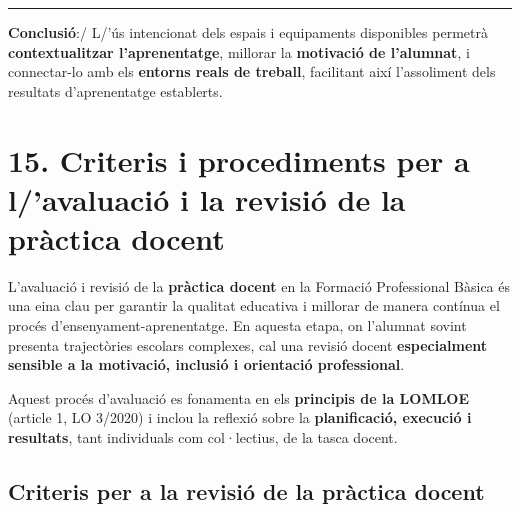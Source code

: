 \documentclass[
  paper=a4,
  ,captions=tableheading
]{scrartcl}
\begin{document}
\begin{center}\rule{0.5\linewidth}{0.5pt}\end{center}

\textbf{Conclusió}:/ L/'ús intencionat dels espais i equipaments
disponibles permetrà \textbf{contextualitzar l'aprenentatge}, millorar
la \textbf{motivació de l'alumnat}, i connectar-lo amb els
\textbf{entorns reals de treball}, facilitant així l'assoliment dels
resultats d'aprenentatge establerts.

\hypertarget{criteris-i-procediments-per-a-lavaluaciuxf3-i-la-revisiuxf3-de-la-pruxe0ctica-docent}{%
\section{15. Criteris i procediments per a l/'avaluació i la revisió de
la pràctica
docent}\label{criteris-i-procediments-per-a-lavaluaciuxf3-i-la-revisiuxf3-de-la-pruxe0ctica-docent}}

L'avaluació i revisió de la \textbf{pràctica docent} en la Formació
Professional Bàsica és una eina clau per garantir la qualitat educativa
i millorar de manera contínua el procés d'ensenyament-aprenentatge. En
aquesta etapa, on l'alumnat sovint presenta trajectòries escolars
complexes, cal una revisió docent \textbf{especialment sensible a la
motivació, inclusió i orientació professional}.

Aquest procés d'avaluació es fonamenta en els \textbf{principis de la
LOMLOE} (article 1, LO 3/2020) i inclou la reflexió sobre la
\textbf{planificació, execució i resultats}, tant individuals com
col·lectius, de la tasca docent.

\hypertarget{criteris-per-a-la-revisiuxf3-de-la-pruxe0ctica-docent}{%
\subsection{Criteris per a la revisió de la pràctica
docent}\label{criteris-per-a-la-revisiuxf3-de-la-pruxe0ctica-docent}}
\end{document}
